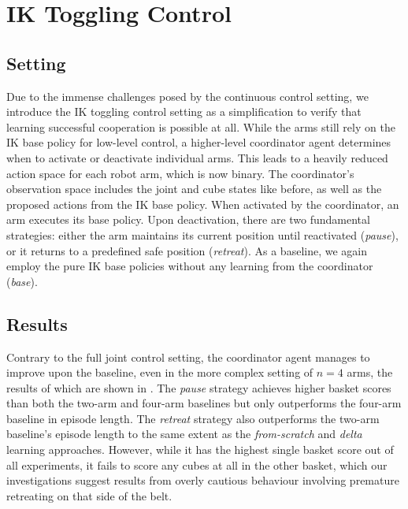 \documentclass[conference,a4paper]{IEEEtran}
\begin{document}
\section{IK Toggling Control}
\label{sec:discrete}

\subsection{Setting}

Due to the immense challenges posed by the continuous control setting, we introduce the IK toggling control setting as a simplification to verify that learning successful cooperation is possible at all. 
While the arms still rely on the IK base policy for low-level control, a higher-level coordinator agent determines when to activate or deactivate individual arms. 
This leads to a heavily reduced action space for each robot arm, which is now binary.
The coordinator's observation space includes the joint and cube states like before, as well as the proposed actions from the IK base policy. 
When activated by the coordinator, an arm executes its base policy. 
Upon deactivation, there are two fundamental strategies: either the arm maintains its current position until reactivated (\emph{pause}), or it returns to a predefined safe position (\emph{retreat}). 
As a baseline, we again employ the pure IK base policies without any learning from the coordinator (\emph{base}).


\subsection{Results}

Contrary to the full joint control setting, the coordinator agent manages to improve upon the baseline, even in the more complex setting of \(n = 4\) arms, the results of which are shown in . The \emph{pause} strategy achieves higher basket scores than both the two-arm and four-arm baselines but only outperforms the four-arm baseline in episode length. The \emph{retreat} strategy also outperforms the two-arm baseline's episode length to the same extent as the \emph{from-scratch} and \emph{delta} learning approaches. However, while it has the highest single basket score out of all experiments, it fails to score any cubes at all in the other basket, which our investigations suggest results from overly cautious behaviour involving premature retreating on that side of the belt.
\end{document}
